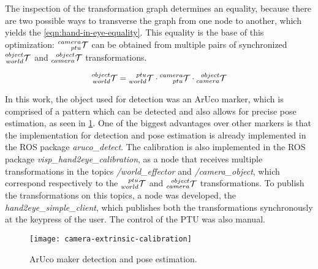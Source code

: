 The inspection of the transformation graph determines an equality, because there are two possible ways to transverse the graph from one node to another, which yields the \cref{eqn:hand-in-eye-equality}. This equality is the base of this optimization: $\TF{ptu}{camera}$ can be obtained from multiple pairs of synchronized $\TF{world}{object}$ and $\TF{camera}{object}$ transformations.

\begin{equation}
    \label{eqn:hand-in-eye-equality}
    \TF{world}{object} = \TF{world}{ptu} \cdot \TF{ptu}{camera} \cdot \TF{camera}{object}
\end{equation}

In this work, the object used for detection was an ArUco marker, which is comprised of a pattern which can be detected and also allows for precise pose estimation, as seen in \cref{fig:aruco-detection}. One of the biggest advantages over other markers is that the implementation for detection and pose estimation is already implemented in the ROS package \emph{aruco\_detect}. The calibration is also implemented in the ROS package \emph{visp\_hand2eye\_calibration}, as a node that receives multiple transformations in the topics \emph{/world\_effector} and \emph{/camera\_object}, which correspond respectively to the $\TF{world}{ptu}$ and $\TF{camera}{object}$ transformations. To publish the transformations on this topics, a node was developed, the \emph{hand2eye\_simple\_client}, which publishes both the transformations synchronously at the keypress of the user. The control of the PTU was also manual. 

\begin{figure}
    
    \centering
    \texttt{[image: camera-extrinsic-calibration]}

    \caption{ArUco maker detection and pose estimation.}
    \label{fig:aruco-detection}
\end{figure}
